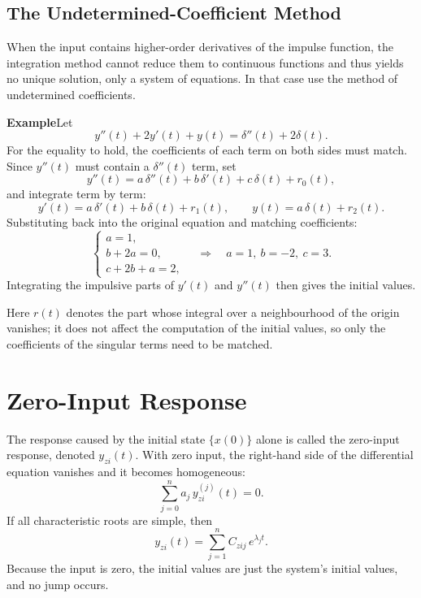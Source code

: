\subsection{The Undetermined-Coefficient Method}

When the input contains higher-order derivatives of the impulse function, the
integration method cannot reduce them to continuous functions and thus yields
no unique solution, only a system of equations. In that case use the method of
undetermined coefficients.

\begin{note}
\textbf{Example}\quad Let
\[
    y''(t)+2y'(t)+y(t)=\delta''(t)+2\delta(t).
\]
For the equality to hold, the coefficients of each term on both sides must
match. Since $y''(t)$ must contain a $\delta''(t)$ term, set
\[
    y''(t)=a\,\delta''(t)+b\,\delta'(t)+c\,\delta(t)+r_0(t),
\]
and integrate term by term:
\[
    y'(t)=a\,\delta'(t)+b\,\delta(t)+r_1(t),
    \qquad
    y(t)=a\,\delta(t)+r_2(t).
\]
Substituting back into the original equation and matching coefficients:
\[
    \begin{cases}
        a=1,\\
        b+2a=0,\\
        c+2b+a=2,
    \end{cases}
    \quad\Longrightarrow\quad
    a=1,\ b=-2,\ c=3 .
\]
Integrating the impulsive parts of $y'(t)$ and $y''(t)$ then gives the initial
values.
\end{note}

\begin{warning}
Here $r(t)$ denotes the part whose integral over a neighbourhood of the origin
vanishes; it does not affect the computation of the initial values, so only
the coefficients of the singular terms need to be matched.
\end{warning}

\section{Zero-Input Response}

The response caused by the initial state $\{x(0)\}$ alone is called the
zero-input response, denoted $y_{zi}(t)$. With zero input, the right-hand side
of the differential equation vanishes and it becomes homogeneous:
\[
    \sum_{j=0}^{n}a_j\,y_{zi}^{(j)}(t)=0 .
\]
If all characteristic roots are simple, then
\[
    y_{zi}(t)=\sum_{j=1}^{n}C_{zij}\,e^{\lambda_j t}.
\]
Because the input is zero, the initial values are just the system's initial
values, and no jump occurs.

